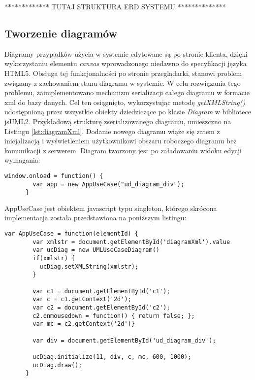     ************* TUTAJ STRUKTURA ERD SYSTEMU **************

    \subsection{Tworzenie diagramów}

      Diagramy przypadków użycia w systemie edytowane są po stronie klienta, dzięki wykorzystaniu elementu \emph{canvas} wprowadzonego niedawno do specyfikacji języka HTML5. Obsługa tej funkcjonalności po stronie przeglądarki, stanowi problem związany z zachowaniem stanu diagramu w systemie. W celu rozwiązania tego problemu, zaimplementowano mechanizm serializacji całego diagramu w formacie xml do bazy danych. Cel ten osiągnięto, wykorzystując metodę \emph{getXMLString()} udostępnioną przez wszystkie obiekty dziedziczące po klasie \emph{Diagram} w bibliotece jsUML2. Przykładową strukturę zserializowanego diagramu, umieszczno na Listingu \ref{lst:diagramXml}. 
      Dodanie nowego diagramu wiąże się zatem z inicjalizacją i wyświetleniem użytkownikowi obszaru roboczego diagramu bez komunikacji z serwerem. Diagram tworzony jest po załadowaniu widoku edycji wymagania:

      \begin{lstlisting}[caption={widok requriement/edit.gsp}, label={lst:appUseCase}]
      window.onload = function() {
        var app = new AppUseCase("ud_diagram_div");
      }

      \end{lstlisting}

      AppUseCase jest obiektem javascript typu singleton, którego skrócona implementacja została przedstawiona na poniższym listingu: 
    
      \begin{lstlisting}[caption={implementacja obiektu JS AppUseCase}, label={lst:appUseCaseImpl}]
      var AppUseCase = function(elementId) { 
        var xmlstr = document.getElementById('diagramXml').value
        var ucDiag = new UMLUseCaseDiagram() 
        if(xmlstr) {
          ucDiag.setXMLString(xmlstr);
        }

        var c1 = document.getElementById('c1');
        var c = c1.getContext('2d');
        var c2 = document.getElementById('c2');
        c2.onmousedown = function() { return false; };
        var mc = c2.getContext('2d')}

        var div = document.getElementById('ud_diagram_div');

        ucDiag.initialize(11, div, c, mc, 600, 1000);
        ucDiag.draw();
      }
      \end{lstlisting}

